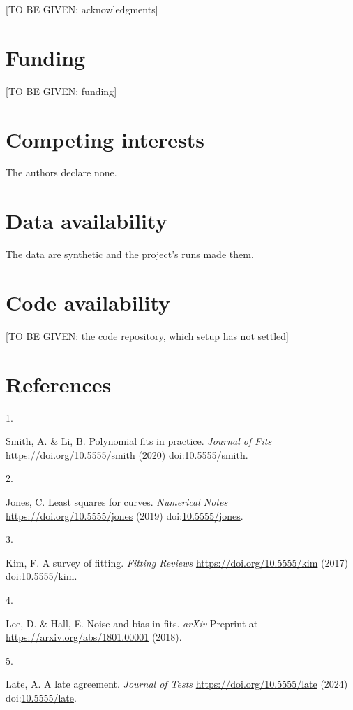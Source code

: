 \documentclass[
]{article}
\newcounter{none} %
\newlength{\cslhangindent}
\newlength{\csllabelwidth}
\newenvironment{CSLReferences}[2] %
 {\begin{list}{}{%
  \setlength{\itemindent}{0pt}
  \setlength{\leftmargin}{0pt}
  \setlength{\parsep}{0pt}
  \ifodd #1
   \setlength{\leftmargin}{\cslhangindent}
   \setlength{\itemindent}{-1\cslhangindent}
  \fi
  \setlength{\itemsep}{#2\baselineskip}}}
 {\end{list}}
\newcommand{\CSLLeftMargin}[1]{\parbox[t]{\csllabelwidth}{\strut#1\strut}}
\newcommand{\CSLRightInline}[1]{\parbox[t]{\linewidth - \csllabelwidth}{\strut#1\strut}}
\begin{document}
{[}TO BE GIVEN: acknowledgments{]}

\section{Funding}\label{funding}

{[}TO BE GIVEN: funding{]}

\section{Competing interests}\label{competing-interests}

The authors declare none.

\section{Data availability}\label{data-availability}

The data are synthetic and the project's runs made them.

\section{Code availability}\label{code-availability}

{[}TO BE GIVEN: the code repository, which setup has not settled{]}

\section{References}\label{references}

\protect{}\label{refs}
\begin{CSLReferences}{0}{0}
\CSLLeftMargin{1. }%
\CSLRightInline{Smith, A. \& Li, B. Polynomial fits in practice.
\emph{Journal of Fits} \url{https://doi.org/10.5555/smith} (2020)
doi:\href{https://doi.org/10.5555/smith}{10.5555/smith}.}

\CSLLeftMargin{2. }%
\CSLRightInline{Jones, C. Least squares for curves. \emph{Numerical
Notes} \url{https://doi.org/10.5555/jones} (2019)
doi:\href{https://doi.org/10.5555/jones}{10.5555/jones}.}

\CSLLeftMargin{3. }%
\CSLRightInline{Kim, F. A survey of fitting. \emph{Fitting Reviews}
\url{https://doi.org/10.5555/kim} (2017)
doi:\href{https://doi.org/10.5555/kim}{10.5555/kim}.}

\CSLLeftMargin{4. }%
\CSLRightInline{Lee, D. \& Hall, E. Noise and bias in fits. \emph{arXiv}
Preprint at \url{https://arxiv.org/abs/1801.00001} (2018).}

\CSLLeftMargin{5. }%
\CSLRightInline{Late, A. A late agreement. \emph{Journal of Tests}
\url{https://doi.org/10.5555/late} (2024)
doi:\href{https://doi.org/10.5555/late}{10.5555/late}.}

\end{CSLReferences}
\end{document}
